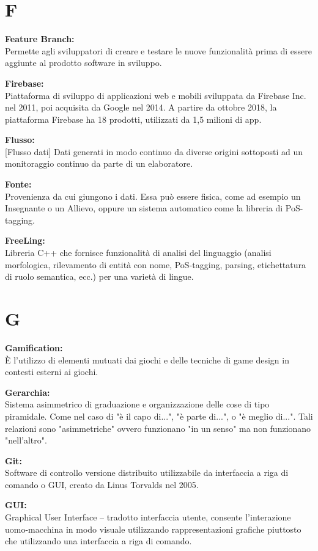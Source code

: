 \documentclass[a4paper, oneside, openany, dvipsnames, table]{article}
\begin{document}
\newpage
\section{F}
\textbf{Feature Branch:}\\	Permette agli sviluppatori di creare e testare le nuove funzionalità  prima di essere aggiunte al prodotto software in sviluppo.

\textbf{Firebase:}\\	Piattaforma di sviluppo di applicazioni web e mobili sviluppata da Firebase Inc. nel 2011, poi acquisita da Google nel 2014. A partire da ottobre 2018, la piattaforma Firebase ha 18 prodotti, utilizzati da 1,5 milioni di app.

\textbf{Flusso:}\\	{[}Flusso dati{]} Dati generati in modo continuo da diverse origini sottoposti ad un monitoraggio continuo da parte di un elaboratore.

\textbf{Fonte:}\\	Provenienza da cui giungono i dati. Essa può essere fisica, come ad esempio un Insegnante o un Allievo, oppure un sistema automatico come la libreria di PoS-tagging.

\textbf{FreeLing:}\\	Libreria C++ che fornisce funzionalità di analisi del linguaggio (analisi morfologica, rilevamento di entità con nome, PoS-tagging, parsing, etichettatura di ruolo semantica, ecc.) per una varietà di lingue.

\newpage
\section{G}

\textbf{Gamification:} \\  \`E l'utilizzo di elementi mutuati dai giochi e delle tecniche di game design in contesti esterni ai giochi.

\textbf{Gerarchia:}\\ Sistema asimmetrico di graduazione e organizzazione delle cose di tipo piramidale.  
Come nel caso di "è il capo di...", "è parte di...", o "è meglio di...". Tali relazioni sono "asimmetriche" ovvero funzionano "in un senso" ma non funzionano "nell'altro".

\textbf{Git:}\\	 Software di controllo versione distribuito utilizzabile da interfaccia a riga di comando o GUI, creato da Linus Torvalds nel 2005.

\textbf{GUI:}\\ Graphical User Interface -- tradotto interfaccia utente, consente l'interazione uomo-macchina in modo visuale utilizzando rappresentazioni grafiche piuttosto che utilizzando una interfaccia a riga di comando.
\end{document}
